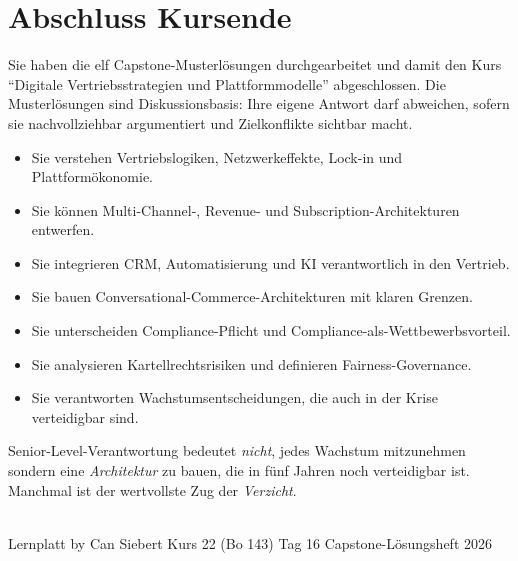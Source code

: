 \documentclass[11pt,a4paper,oneside]{article}
\begin{document}
\clearpage

\section*{Abschluss \textendash{} Kursende}
\thispagestyle{plain}

\noindent Sie haben die elf Capstone-Musterlösungen durchgearbeitet \textendash{} und damit den Kurs ``Digitale Vertriebsstrategien und Plattformmodelle'' abgeschlossen. Die Musterlösungen sind Diskussionsbasis: Ihre eigene Antwort darf abweichen, sofern sie nachvollziehbar argumentiert und Zielkonflikte sichtbar macht.

\medskip
\begin{infobox}
\begin{itemize}
  \item Sie verstehen Vertriebslogiken, Netzwerkeffekte, Lock-in und Plattformökonomie.
  \item Sie können Multi-Channel-, Revenue- und Subscription-Architekturen entwerfen.
  \item Sie integrieren CRM, Automatisierung und KI verantwortlich in den Vertrieb.
  \item Sie bauen Conversational-Commerce-Architekturen mit klaren Grenzen.
  \item Sie unterscheiden Compliance-Pflicht und Compliance-als-Wettbewerbsvorteil.
  \item Sie analysieren Kartellrechtsrisiken und definieren Fairness-Governance.
  \item Sie verantworten Wachstumsentscheidungen, die auch in der Krise verteidigbar sind.
\end{itemize}
\end{infobox}

\medskip
\begin{infobox}
Senior-Level-Verantwortung bedeutet \emph{nicht}, jedes Wachstum mitzunehmen \textendash{} sondern eine \emph{Architektur} zu bauen, die in fünf Jahren noch verteidigbar ist. Manchmal ist der wertvollste Zug der \emph{Verzicht}.
\end{infobox}

\vspace{1cm}
\noindent{\color{lpAccent}\rule{\linewidth}{0.6pt}}\\[4pt]
{\footnotesize\sffamily\color{lpGray}Lernplatt \textperiodcentered{} by Can Siebert \textperiodcentered{} Kurs 22 (Bo 143) \textperiodcentered{} Tag 16 \textperiodcentered{} Capstone-Lösungsheft \textperiodcentered{} \textcopyright{} 2026}
\end{document}
